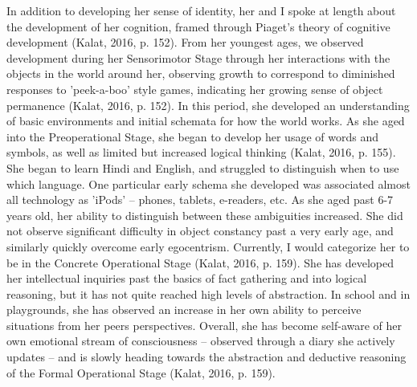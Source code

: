 \documentclass[a4paper, 10pt]{article}
\begin{document}
	In addition to developing her sense of identity, her and I spoke at length about the development of her cognition, framed through Piaget's theory of cognitive development (Kalat, 2016, p. 152). From her youngest ages, we observed development during her Sensorimotor Stage through her interactions with the objects in the world around her, observing growth to correspond to diminished responses to 'peek-a-boo' style games, indicating her growing sense of object permanence (Kalat, 2016, p. 152). In this period, she developed an understanding of basic environments and initial schemata for how the world works. As she aged into the Preoperational Stage, she began to develop her usage of words and symbols, as well as limited but increased logical thinking (Kalat, 2016, p. 155). She began to learn Hindi and English, and struggled to distinguish when to use which language. One particular early schema she developed was associated almost all technology as 'iPods' -- phones, tablets, e-readers, etc. As she aged past 6-7 years old, her ability to distinguish between these ambiguities increased. She did not observe significant difficulty in object constancy past a very early age, and similarly quickly overcome early egocentrism. Currently, I would categorize her to be in the Concrete Operational Stage (Kalat, 2016, p. 159). She has developed her intellectual inquiries past the basics of fact gathering and into logical reasoning, but it has not quite reached high levels of abstraction. In school and in playgrounds, she has observed an increase in her own ability to perceive situations from her peers perspectives. Overall, she has become self-aware of her own emotional stream of consciousness -- observed through a diary she actively updates -- and is slowly heading towards the abstraction and deductive reasoning of the Formal Operational Stage (Kalat, 2016, p. 159).
	
\end{document}
